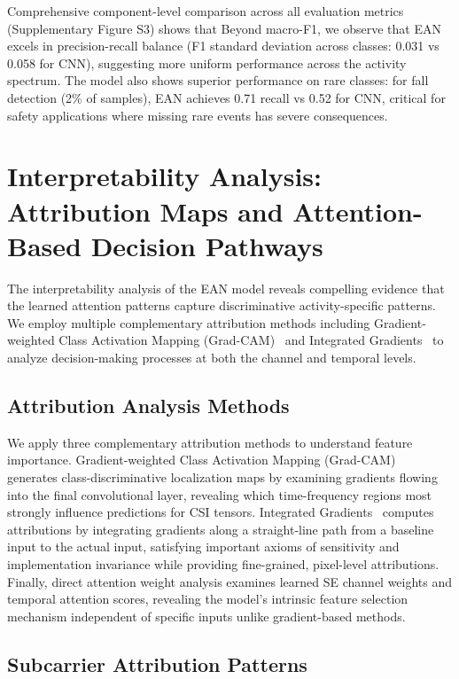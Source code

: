 \documentclass[lettersize,journal]{IEEEtran}
\begin{document}
Comprehensive component-level comparison across all evaluation metrics (Supplementary Figure S3) shows that Beyond macro-F1, we observe that EAN excels in precision-recall balance (F1 standard deviation across classes: 0.031 vs 0.058 for CNN), suggesting more uniform performance across the activity spectrum. The model also shows superior performance on rare classes: for fall detection (2\% of samples), EAN achieves 0.71 recall vs 0.52 for CNN, critical for safety applications where missing rare events has severe consequences.

\section{Interpretability Analysis: Attribution Maps and Attention-Based Decision Pathways}

The interpretability analysis of the EAN model reveals compelling evidence that the learned attention patterns capture discriminative activity-specific patterns. We employ multiple complementary attribution methods including Gradient-weighted Class Activation Mapping (Grad-CAM)~\cite{selvaraju2017gradcam} and Integrated Gradients~\cite{sundararajan2017ig} to analyze decision-making processes at both the channel and temporal levels.

\subsection{Attribution Analysis Methods}

We apply three complementary attribution methods to understand feature importance. Gradient-weighted Class Activation Mapping (Grad-CAM)~\cite{selvaraju2017gradcam} generates class-discriminative localization maps by examining gradients flowing into the final convolutional layer, revealing which time-frequency regions most strongly influence predictions for CSI tensors. Integrated Gradients~\cite{sundararajan2017ig} computes attributions by integrating gradients along a straight-line path from a baseline input to the actual input, satisfying important axioms of sensitivity and implementation invariance while providing fine-grained, pixel-level attributions. Finally, direct attention weight analysis examines learned SE channel weights and temporal attention scores, revealing the model's intrinsic feature selection mechanism independent of specific inputs unlike gradient-based methods.

\subsection{Subcarrier Attribution Patterns}
\end{document}
